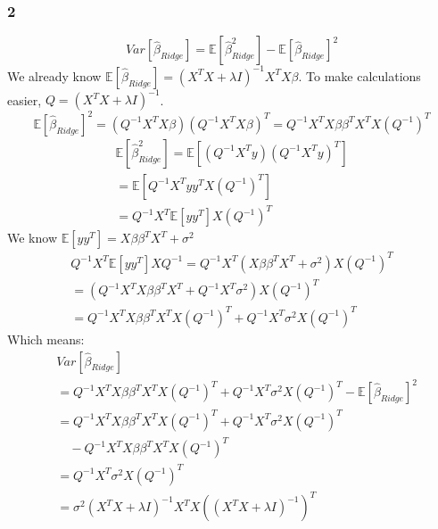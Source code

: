 \documentclass{article}
\begin{document}
\subsubsection{2}
\begin{equation}
    Var[\hat{\beta}_{Ridge}] = \mathbb{E}[\hat{\beta}_{Ridge}^2] - \mathbb{E}[\hat{\beta}_{Ridge}]^2
\end{equation}
We already know $\mathbb{E}[\hat{\beta}_{Ridge}] = (X^TX + \lambda I)^{-1}X^TX\beta$.
\newline
\newline
To make calculations easier, $Q = (X^TX+\lambda I)^{-1}$.
\begin{equation}
    \mathbb{E}[\hat{\beta}_{Ridge}]^2 = (Q^{-1}X^TX\beta)(Q^{-1}X^TX\beta)^T = Q^{-1}X^TX\beta\beta^TX^TX(Q^{-1})^T
\end{equation}
\begin{equation}
\begin{split}
    \mathbb{E}[\hat{\beta}_{Ridge}^2] = \mathbb{E}[(Q^{-1}X^Ty)(Q^{-1}X^Ty)^T]\\
    = \mathbb{E}[Q^{-1}X^Tyy^TX(Q^{-1})^T]\\
    = Q^{-1}X^T\mathbb{E}[yy^T]X(Q^{-1})^T
\end{split}
\end{equation}
We know $\mathbb{E}[yy^T] = X\beta\beta^TX^T + \sigma^2$
\begin{equation}
    \begin{split}
        Q^{-1}X^T\mathbb{E}[yy^T]XQ^{-1} = Q^{-1}X^T(X\beta\beta^TX^T + \sigma^2)X(Q^{-1})^T\\
        = (Q^{-1}X^TX\beta\beta^TX^T + Q^{-1}X^T\sigma^2)X(Q^{-1})^T\\
        = Q^{-1}X^TX\beta\beta^TX^TX(Q^{-1})^T + Q^{-1}X^T\sigma^2X(Q^{-1})^T
    \end{split}
\end{equation}
Which means:
\begin{equation}
    \begin{split}
        &Var[\hat{\beta}_{Ridge}]\\ 
        &= Q^{-1}X^TX\beta\beta^TX^TX(Q^{-1})^T + Q^{-1}X^T\sigma^2X(Q^{-1})^T - \mathbb{E}[\hat{\beta}_{Ridge}]^2\\
        &= Q^{-1}X^TX\beta\beta^TX^TX(Q^{-1})^T + Q^{-1}X^T\sigma^2X(Q^{-1})^T\\ &\quad- Q^{-1}X^TX\beta\beta^TX^TX(Q^{-1})^T\\
        &= Q^{-1}X^T\sigma^2X(Q^{-1})^T\\
        &= \sigma^2(X^TX+\lambda I)^{-1}X^TX((X^TX+\lambda I)^{-1})^T\
    \end{split}
\end{equation}
\end{document}
